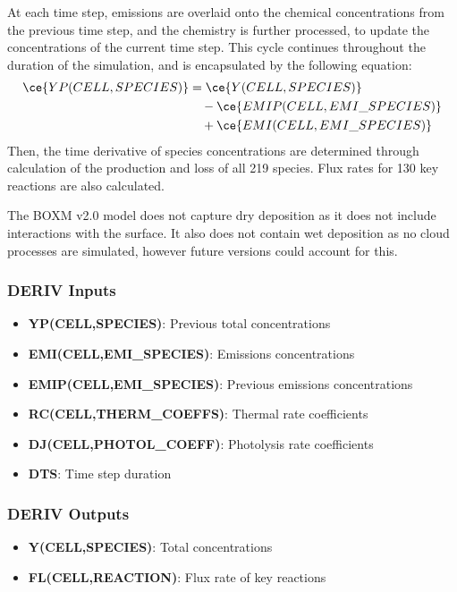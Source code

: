At each time step, emissions are overlaid onto the chemical concentrations from the previous time step, and the chemistry is further processed, to update the concentrations of the current time step. This cycle continues throughout the duration of the simulation, and is encapsulated by the following equation:
\begin{align}
    \ce{YP(CELL,SPECIES)} &= \ce{Y(CELL,SPECIES)} \notag \\
    &\quad - \ce{EMIP(CELL,EMI\_SPECIES)} \\
    &\quad + \ce{EMI(CELL,EMI\_SPECIES)} \notag
\end{align}
Then, the time derivative of species concentrations are determined through calculation of the production and loss of all 219 species. Flux rates for 130 key reactions are also calculated.

The BOXM v2.0 model does not capture dry deposition as it does not include interactions with the surface. It also does not contain wet deposition as no cloud processes are simulated, however future versions could account for this.


\subsubsection{DERIV Inputs}
\begin{itemize}
    \item \textbf{YP(CELL,SPECIES)}: Previous total concentrations
    \item \textbf{EMI(CELL,EMI\_SPECIES)}: Emissions concentrations
    \item \textbf{EMIP(CELL,EMI\_SPECIES)}: Previous emissions concentrations
    \item \textbf{RC(CELL,THERM\_COEFFS)}: Thermal rate coefficients
    \item \textbf{DJ(CELL,PHOTOL\_COEFF)}: Photolysis rate coefficients
    \item \textbf{DTS}: Time step duration
\end{itemize}

\subsubsection{DERIV Outputs}
\begin{itemize}
    \item \textbf{Y(CELL,SPECIES)}: Total concentrations
    \item \textbf{FL(CELL,REACTION)}: Flux rate of key reactions
\end{itemize}

